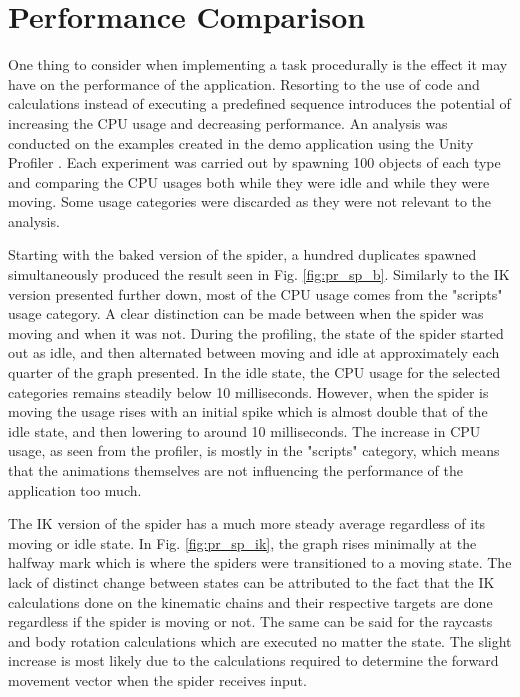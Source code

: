 \section{Performance Comparison}
One thing to consider when implementing a task procedurally is the
effect it may have on the performance of the application. Resorting to the use
of code and calculations instead of executing a predefined sequence introduces
the potential of increasing the CPU usage and decreasing performance. An
analysis was conducted on the examples created in the demo application using the
Unity Profiler \cite{unity_profiler}. Each experiment was carried out by
spawning 100 objects of each type and comparing the CPU usages both while they
were idle and while they were moving. Some usage categories were discarded as
they were not relevant to the analysis.


Starting with the baked version of the spider, a hundred duplicates spawned
simultaneously produced the result seen in Fig. \ref{fig:pr_sp_b}. Similarly
to the IK version presented further down, most of the CPU usage comes from the
"scripts" usage category. A clear distinction can be made between when the
spider was moving and when it was not. During the profiling, the state of the
spider started out as idle, and then alternated between moving and idle at
approximately each quarter of the graph presented. In the idle state, the CPU
usage for the selected categories remains steadily below 10 milliseconds.
However, when the spider is moving the usage rises with an initial spike which
is almost double that of the idle state, and then lowering to around 10
milliseconds. The increase in CPU usage, as seen from the profiler, is mostly in
the "scripts" category, which means that the animations themselves are not
influencing the performance of the application too much.

The IK version of the spider has a much more steady average regardless of its
moving or idle state. In Fig. \ref{fig:pr_sp_ik}, the graph rises minimally at the
halfway mark which is where the spiders were transitioned to a moving state.
The lack of distinct change between states can be attributed to the fact that
the IK calculations done on the kinematic chains and their respective targets
are done regardless if the spider is moving or not. The same can be said for the
raycasts and body rotation calculations which are executed no matter the state.
The slight increase is most likely due to the calculations required to determine
the forward movement vector when the spider receives input. 

